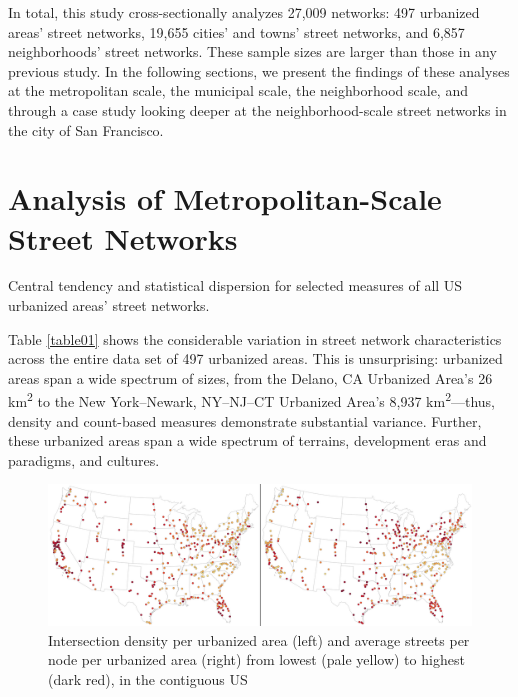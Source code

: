 \documentclass[Afour,sageh,times]{sage/sagej}
\begin{document}
In total, this study cross-sectionally analyzes 27,009 networks: 497 urbanized areas' street networks, 19,655 cities' and towns' street networks, and 6,857 neighborhoods' street networks. These sample sizes are larger than those in any previous study. In the following sections, we present the findings of these analyses at the metropolitan scale, the municipal scale, the neighborhood scale, and through a case study looking deeper at the neighborhood-scale street networks in the city of San Francisco.

\section{Analysis of Metropolitan-Scale Street Networks}

\begin{table}[h]
\caption{Central tendency and statistical dispersion for selected measures of all US urbanized areas' street networks.}
\label{table01}
\end{table}

Table \ref{table01} shows the considerable variation in street network characteristics across the entire data set of 497 urbanized areas. This is unsurprising: urbanized areas span a wide spectrum of sizes, from the Delano, CA Urbanized Area's 26 km\textsuperscript{2} to the New York--Newark, NY--NJ--CT Urbanized Area's 8,937 km\textsuperscript{2}---thus, density and count-based measures demonstrate substantial variance. Further, these urbanized areas span a wide spectrum of terrains, development eras and paradigms, and cultures.

\begin{figure}[h]
\includegraphics[width=1\textwidth]{media/fig01.png}
\caption{Intersection density per urbanized area (left) and average streets per node per urbanized area (right) from lowest (pale yellow) to highest (dark red), in the contiguous US}
\label{fig01}
\end{figure}
\end{document}
